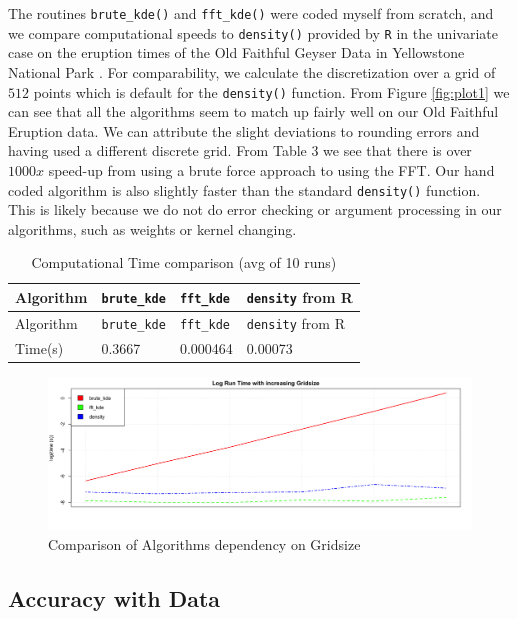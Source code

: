 \documentclass[12pt]{article}
\begin{document}
The routines \texttt{brute\_kde()} and \texttt{fft\_kde()} were coded
myself from scratch, and we compare computational speeds to
\texttt{density()} provided by \texttt{R} in the univariate case on the
eruption times of the Old Faithful Geyser Data in Yellowstone National
Park \citep{azzalini1990look}. For comparability, we calculate the
discretization over a grid of \(512\) points which is default for the
\texttt{density()} function. From Figure \ref{fig:plot1} we can see that
all the algorithms seem to match up fairly well on our Old Faithful
Eruption data. We can attribute the slight deviations to rounding errors
and having used a different discrete grid. From Table 3 we see that
there is over \(1000x\) speed-up from using a brute force approach to
using the FFT. Our hand coded algorithm is also slightly faster than the
standard \texttt{density()} function. This is likely because we do not
do error checking or argument processing in our algorithms, such as
weights or kernel changing.

\begin{longtable}[]{@{}llll@{}}
\caption{Computational Time comparison (avg of 10 runs)}\tabularnewline
\toprule
Algorithm & \texttt{brute\_kde} & \texttt{fft\_kde} & \texttt{density}
from R\tabularnewline
\midrule
\endfirsthead
\toprule
Algorithm & \texttt{brute\_kde} & \texttt{fft\_kde} & \texttt{density}
from R\tabularnewline
\midrule
\endhead
Time(s) & 0.3667 & 0.000464 & 0.00073\tabularnewline
\bottomrule
\end{longtable}

\begin{figure}[h]
\label{fig:gs}
\caption{Comparison of Algorithms dependency on Gridsize}
\includegraphics[scale=.3]{gridsize_time}
\centering
\end{figure}

\subsection{Accuracy with Data}\label{accuracy-with-data}
\end{document}
